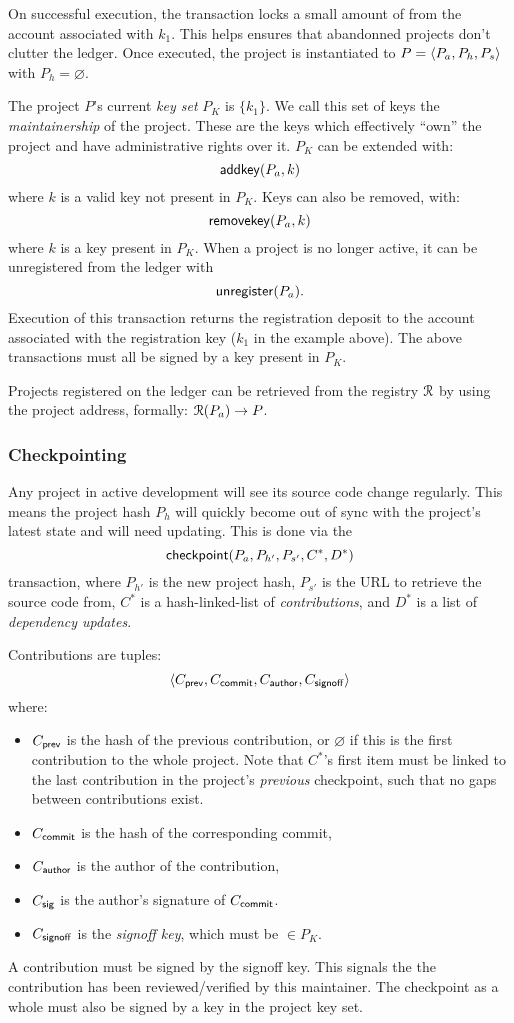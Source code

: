 On successful execution, the transaction locks a small amount of \oscoin{} from
the account associated with $k_1$. This helps ensures that abandonned projects
don't clutter the ledger.  Once executed, the project is instantiated to $P =
\langle P_a, P_h, P_s\rangle$ with $P_h = \varnothing$.

The project $P$'s current \emph{key set} $P_K$ is $\{k_1\}$. We call this set of
keys the \emph{maintainership} of the project. These are the keys which effectively
``own'' the project and have administrative rights over it. $P_K$ can be extended
with:
\[
    \mathsf{addkey}\lparen P_a, k\rparen
\]
where $k$ is a valid key not present in $P_K$. Keys can also be removed, with:
\[
    \mathsf{removekey}\lparen P_a, k\rparen
\]
where $k$ is a key present in $P_K$. When a project is no longer active, it can be
unregistered from the ledger with
\[
    \mathsf{unregister}\lparen P_a\rparen.
\]
Execution of this transaction returns the registration deposit to the account
associated with the registration key ($k_1$ in the example above).  The above
transactions must all be signed by a key present in $P_K$.

Projects registered on the ledger can be retrieved from the registry $\mathcal{R}$ by
using the project address, formally: $\mathcal{R}(P_a) \to P$.

\subsubsection{Checkpointing} \label{s:checkpointing} Any project in active
development will see its source code change regularly. This means the project
hash $P_h$ will quickly become out of sync with the project's latest state and
will need updating. This is done via the
\[
    \mathsf{checkpoint}\lparen P_a, P_{h'}, P_{s'}, C^*, D^*\rparen
\]
transaction, where $P_{h'}$ is the new project hash, $P_{s'}$ is the URL to
retrieve the source code from, $C^*$ is a hash-linked-list of
\emph{contributions}, and $D^*$ is a list of \emph{dependency updates}.

Contributions are tuples:
\[
   \langle C_{\mathsf{prev}}, C_{\mathsf{commit}}, C_{\mathsf{author}}, C_{\mathsf{signoff}}\rangle
\]
where:
\begin{itemize}
\item $C_{\mathsf{prev}}$ is the hash of the previous contribution, or
  $\varnothing$ if this is the first contribution to the whole
  project. Note that $C^*$'s first item must be linked to the last
  contribution in the project's \emph{previous} checkpoint, such that no
  gaps between contributions exist.
\item $C_{\mathsf{commit}}$ is the hash of the corresponding commit,
\item $C_{\mathsf{author}}$ is the author of the contribution,
\item $C_{\mathsf{sig}}$ is the author's signature of $C_{\mathsf{commit}}$.
\item $C_{\mathsf{signoff}}$ is the \emph{signoff key}, which must be $\in P_K$.
\end{itemize}
A contribution must be signed by the signoff key. This signals the
the contribution has been reviewed/verified by this maintainer. The
checkpoint as a whole must also be signed by a key in the project key set.

